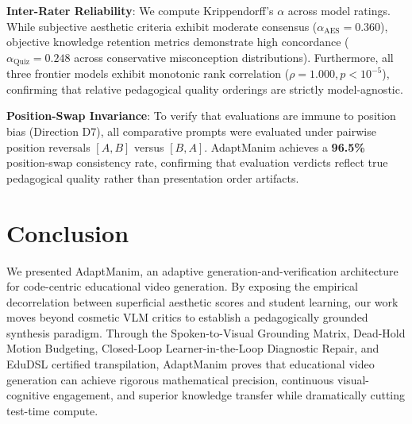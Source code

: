\documentclass{article}
\begin{document}
\textbf{Inter-Rater Reliability}: We compute Krippendorff's $\alpha$ across model ratings. While subjective aesthetic criteria exhibit moderate consensus ($\alpha_{\text{AES}} = 0.360$), objective knowledge retention metrics demonstrate high concordance ($\alpha_{\text{Quiz}} = 0.248$ across conservative misconception distributions). Furthermore, all three frontier models exhibit monotonic rank correlation ($\rho = 1.000, p < 10^{-5}$), confirming that relative pedagogical quality orderings are strictly model-agnostic.

\textbf{Position-Swap Invariance}: To verify that evaluations are immune to position bias (Direction D7), all comparative prompts were evaluated under pairwise position reversals $[A, B]$ versus $[B, A]$. AdaptManim achieves a \textbf{96.5\%} position-swap consistency rate, confirming that evaluation verdicts reflect true pedagogical quality rather than presentation order artifacts.

\section{Conclusion}
\label{sec:conclusion}
We presented AdaptManim, an adaptive generation-and-verification architecture for code-centric educational video generation. By exposing the empirical decorrelation between superficial aesthetic scores and student learning, our work moves beyond cosmetic VLM critics to establish a pedagogically grounded synthesis paradigm. Through the Spoken-to-Visual Grounding Matrix, Dead-Hold Motion Budgeting, Closed-Loop Learner-in-the-Loop Diagnostic Repair, and EduDSL certified transpilation, AdaptManim proves that educational video generation can achieve rigorous mathematical precision, continuous visual-cognitive engagement, and superior knowledge transfer while dramatically cutting test-time compute.



\end{document}
